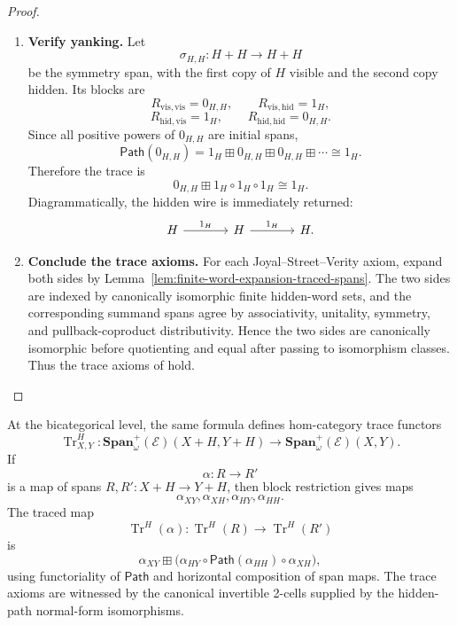 \begin{proof}
\begin{enumerate}
  \item \textbf{Verify yanking.}
  Let
  \[
    \sigma_{H,H}:H+H\to H+H
  \]
  be the symmetry span, with the first copy of \(H\) visible and the second
  copy hidden. Its blocks are
  \[
    R_{\mathrm{vis},\mathrm{vis}}=0_{H,H},
    \qquad
    R_{\mathrm{vis},\mathrm{hid}}=1_H,
  \]
  \[
    R_{\mathrm{hid},\mathrm{vis}}=1_H,
    \qquad
    R_{\mathrm{hid},\mathrm{hid}}=0_{H,H}.
  \]
  Since all positive powers of \(0_{H,H}\) are initial spans,
  \[
    \mathsf{Path}(0_{H,H})
    =
    1_H\boxplus 0_{H,H}\boxplus 0_{H,H}\boxplus\cdots
    \cong 1_H.
  \]
  Therefore the trace is
  \[
    0_{H,H}\boxplus 1_H\circ1_H\circ1_H
    \cong
    1_H.
  \]
  Diagrammatically, the hidden wire is immediately returned:
  \[
  \begin{tikzcd}[column sep=large,row sep=large]
    H
      \ar[r,"1_H"]
    &
    H
      \ar[r,"1_H"]
    &
    H .
  \end{tikzcd}
  \]

  \item \textbf{Conclude the trace axioms.}
  For each Joyal--Street--Verity axiom, expand both sides by
  Lemma~\ref{lem:finite-word-expansion-traced-spans}. The two sides are
  indexed by canonically isomorphic finite hidden-word sets, and the
  corresponding summand spans agree by associativity, unitality, symmetry, and
  pullback-coproduct distributivity. Hence the two sides are canonically
  isomorphic before quotienting and equal after passing to isomorphism
  classes. Thus the trace axioms of
  \cite{JoyalStreetVerity1996TracedMonoidalCategories} hold.
\end{enumerate}
\end{proof}

At the bicategorical level, the same formula defines hom-category trace
functors
\[
  \operatorname{Tr}^{H}_{X,Y}:
  \mathbf{Span}^{+}_{\omega}(\mathcal E)(X+H,Y+H)
  \longrightarrow
  \mathbf{Span}^{+}_{\omega}(\mathcal E)(X,Y).
\]
If
\[
  \alpha:R\to R'
\]
is a map of spans \(R,R':X+H\to Y+H\), then block restriction gives maps
\[
  \alpha_{XY},\alpha_{XH},\alpha_{HY},\alpha_{HH}.
\]
The traced map
\[
  \operatorname{Tr}^{H}(\alpha):
  \operatorname{Tr}^{H}(R)\to \operatorname{Tr}^{H}(R')
\]
is
\[
  \alpha_{XY}
  \boxplus
  \bigl(
    \alpha_{HY}\circ
    \mathsf{Path}(\alpha_{HH})\circ
    \alpha_{XH}
  \bigr),
\]
using functoriality of \(\mathsf{Path}\) and horizontal composition of span
maps. The trace axioms are witnessed by the canonical invertible 2-cells
supplied by the hidden-path normal-form isomorphisms.

